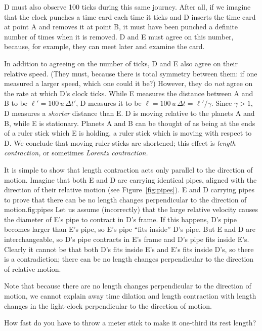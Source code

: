 D must also observe 100 ticks during this same journey.  After all, if
we imagine that the clock punches a time card each time it ticks and D
inserts the time card at point A and removes it at point B, it must
have been punched a definite number of times when it is removed.  D
and E must agree on this number, because, for example, they can meet
later and examine the card.

In addition to agreeing on the number of ticks, D and E also agree on
their relative speed.  (They must, because there is total symmetry
between them: if one measured a larger speed, which one could it be?)
However, they do {\em not\/} agree on the rate at which D's clock
ticks.  While E measures the distance between A and B to be
$\ell'=100\, u\,\Delta t'$, D measures it to be $\ell=100\, u\,\Delta
t=\ell'/\gamma$.  Since $\gamma >1$, D measures a {\em shorter\/}
distance than E.  D is moving relative to the planets A and B, while E
is stationary.  Planets A and B can be thought of as being at the ends
of a ruler stick which E is holding, a ruler stick which is moving
with respect to D.  We conclude that moving ruler sticks are
shortened; this effect is {\em length contraction,\/} or sometimes
{\em Lorentz contraction.\/}

It is simple to show that length contraction acts only parallel to the
direction of motion.  Imagine that both E and D are carrying identical
pipes, aligned with the direction of their relative motion (see
Figure~\ref{fig:pipes}).
%
{E and D carrying pipes to prove that
there can be no length changes perpendicular to the direction of
motion.}{fig:pipes}
Let us assume (incorrectly) that the large relative velocity causes
the diameter of E's pipe to contract in D's frame.  If this happens,
D's pipe becomes larger than E's pipe, so E's pipe ``fits inside'' D's
pipe.  But E and D are interchangeable, so D's pipe contracts in E's
frame and D's pipe fits inside E's.  Clearly it cannot be that both
D's fits inside E's and E's fits inside D's, so there is a
contradiction; there can be no length changes perpendicular to the
direction of relative motion.

Note that because there are no length changes perpendicular to the
direction of motion, we cannot explain away time dilation and length
contraction with length changes in the light-clock perpendicular to
the direction of motion.

\begin{problem}
How fast do you have to throw a meter stick to make it one-third its
rest length?
\end{problem}

